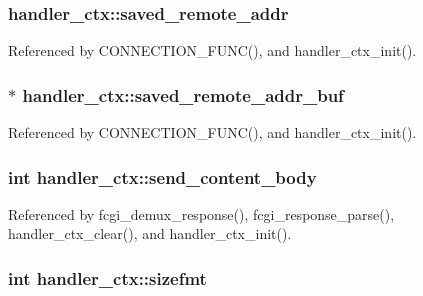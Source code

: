 \hypertarget{structhandler__ctx_ac77086e5d028b1f34113b97ef987693b}{
\subsubsection[{saved\-\_\-remote\-\_\-addr}]{ handler\-\_\-ctx\-::saved\-\_\-remote\-\_\-addr}}\label{structhandler__ctx_ac77086e5d028b1f34113b97ef987693b}


Referenced by C\-O\-N\-N\-E\-C\-T\-I\-O\-N\-\_\-\-F\-U\-N\-C(), and handler\-\_\-ctx\-\_\-init().

\hypertarget{structhandler__ctx_ad7a957e320e60a79d1d4eaebcaa02cd6}{
\subsubsection[{saved\-\_\-remote\-\_\-addr\-\_\-buf}]{$\ast$ handler\-\_\-ctx\-::saved\-\_\-remote\-\_\-addr\-\_\-buf}}\label{structhandler__ctx_ad7a957e320e60a79d1d4eaebcaa02cd6}


Referenced by C\-O\-N\-N\-E\-C\-T\-I\-O\-N\-\_\-\-F\-U\-N\-C(), and handler\-\_\-ctx\-\_\-init().

\hypertarget{structhandler__ctx_a1583c769132edef095dd9e9255e7c23b}{
\subsubsection[{send\-\_\-content\-\_\-body}]{\setlength{\rightskip}{0pt plus 5cm}int handler\-\_\-ctx\-::send\-\_\-content\-\_\-body}}\label{structhandler__ctx_a1583c769132edef095dd9e9255e7c23b}


Referenced by fcgi\-\_\-demux\-\_\-response(), fcgi\-\_\-response\-\_\-parse(), handler\-\_\-ctx\-\_\-clear(), and handler\-\_\-ctx\-\_\-init().

\hypertarget{structhandler__ctx_a2d9f398ea05f04186f26e30661c735bc}{
\subsubsection[{sizefmt}]{\setlength{\rightskip}{0pt plus 5cm}int handler\-\_\-ctx\-::sizefmt}}\label{structhandler__ctx_a2d9f398ea05f04186f26e30661c735bc}


